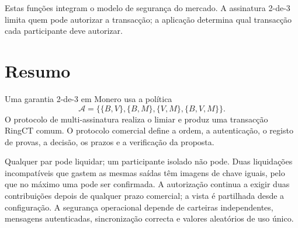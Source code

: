 Estas funções integram o modelo de segurança do mercado. A assinatura 2-de-3 limita quem pode autorizar a
transacção; a aplicação determina qual transacção cada participante deve
autorizar.

\section{Resumo}

Uma garantia 2-de-3 em Monero usa a política
\[
 \mathcal A
 =\{\{B,V\},\{B,M\},\{V,M\},\{B,V,M\}\}.
\]
O protocolo de multi-assinatura realiza o limiar e produz uma transacção
RingCT comum. O protocolo comercial define a ordem, a autenticação, o registo
de provas, a decisão, os prazos e a verificação da proposta.

Qualquer par pode liquidar; um participante isolado não pode. Duas
liquidações incompatíveis que gastem as mesmas saídas têm imagens de chave
iguais, pelo que no máximo uma pode ser confirmada. A autorização continua a
exigir duas contribuições depois de qualquer prazo comercial; a vista é
partilhada desde a configuração. A segurança operacional depende de carteiras
independentes, mensagens autenticadas, sincronização correcta e valores
aleatórios de uso único.
